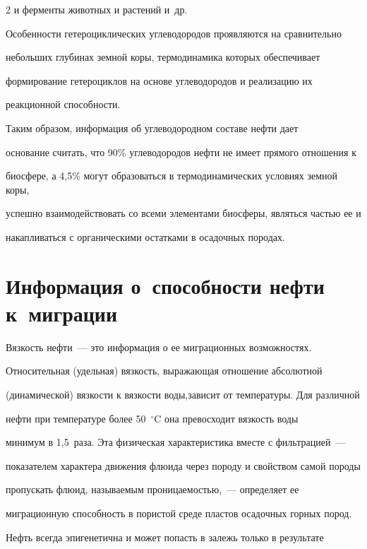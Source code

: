\begin{multicols}{2}
и ферменты животных и рас\-те\-ний и~др. 

     

     Особенности гетероциклических углеводородов проявляются на сравнительно 

небольших глубинах земной коры, термодинамика которых обеспечивает 

формирование гетероциклов на основе углеводородов и реализацию их 

реакционной способности. 

     

     Таким образом, информация об углеводородном составе нефти дает 

основание считать, что 90\% углеводородов нефти не имеет прямого отношения к 

биосфере, а 4,5\% могут образоваться в термодинамических условиях земной коры, 

успешно взаимодействовать со всеми элементами биосферы, являться частью ее и 

накапливаться с органическими остатками в осадочных породах. 

     

\section{Информация о~способности нефти к~миграции}



     Вязкость нефти~--- это информация о ее миг\-ра\-ци\-он\-ных возможностях. 

Относительная (удельная) вязкость, выражающая отношение абсолютной 

(динамической) вязкости к вязкости воды,\linebreak зависит от температуры. Для различной 

нефти при температуре более 50~$^\circ$C она превосходит вязкость воды 

минимум в 1,5~раза. Эта физическая характеристика вместе с фильтрацией~--- 

показателем характера движения флюида через породу и свойством самой породы 

пропускать флюид, называемым проницаемостью,~--- определяет ее 

миг\-ра\-ци\-он\-ную способность в пористой среде пластов осадочных горных пород. 

     

     Нефть всегда эпигенетична и может попасть в залежь только в результате 


\end{multicols}
